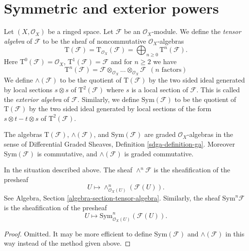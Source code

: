 \section{Symmetric and exterior powers}
\label{section-symmetric-exterior}

\noindent
Let $(X, \mathcal{O}_X)$ be a ringed space.
Let $\mathcal{F}$ be an $\mathcal{O}_X$-module.
We define the {\it tensor algebra} of $\mathcal{F}$ to be
the sheaf of noncommutative $\mathcal{O}_X$-algebras
$$
\text{T}(\mathcal{F})
=
\text{T}_{\mathcal{O}_X}(\mathcal{F})
= \bigoplus\nolimits_{n \geq 0} \text{T}^n(\mathcal{F}).
$$
Here $\text{T}^0(\mathcal{F}) = \mathcal{O}_X$,
$\text{T}^1(\mathcal{F}) = \mathcal{F}$
and for $n \geq 2$ we have
$$
\text{T}^n(\mathcal{F}) =
\mathcal{F} \otimes_{\mathcal{O}_X} \ldots \otimes_{\mathcal{O}_X} \mathcal{F}
\ \ (n\text{ factors})
$$
We define $\wedge(\mathcal{F})$ to be the quotient of
$\text{T}(\mathcal{F})$ by the two sided ideal generated by
local sections $s \otimes s$ of $\text{T}^2(\mathcal{F})$ where
$s$ is a local section of $\mathcal{F}$. This is
called the {\it exterior algebra} of $\mathcal{F}$.
Similarly, we define $\text{Sym}(\mathcal{F})$ to be
the quotient of $\text{T}(\mathcal{F})$ by the two
sided ideal generated by local sections of the form
$s \otimes t - t \otimes s$ of $\text{T}^2(\mathcal{F})$.

\medskip\noindent
The algebras $\text{T}(\mathcal{F})$, $\wedge(\mathcal{F})$, and
$\text{Sym}(\mathcal{F})$ are graded $\mathcal{O}_X$-algebras
in the sense of Differential Graded Sheaves, Definition
\ref{sdga-definition-ga}.
Moreover $\text{Sym}(\mathcal{F})$
is commutative, and $\wedge(\mathcal{F})$ is graded commutative.

\begin{lemma}
\label{lemma-local-tensor-algebra}
In the situation described above.
The sheaf $\wedge^n\mathcal{F}$ is the sheafification of the
presheaf
$$
U \longmapsto \wedge^n_{\mathcal{O}_X(U)}(\mathcal{F}(U)).
$$
See Algebra, Section \ref{algebra-section-tensor-algebra}.
Similarly, the sheaf $\text{Sym}^n\mathcal{F}$ is the sheafification
of the presheaf
$$
U \longmapsto \text{Sym}^n_{\mathcal{O}_X(U)}(\mathcal{F}(U)).
$$
\end{lemma}

\begin{proof}
Omitted. It may be more efficient to define $\text{Sym}(\mathcal{F})$
and $\wedge(\mathcal{F})$ in this way instead of the method
given above.
\end{proof}

